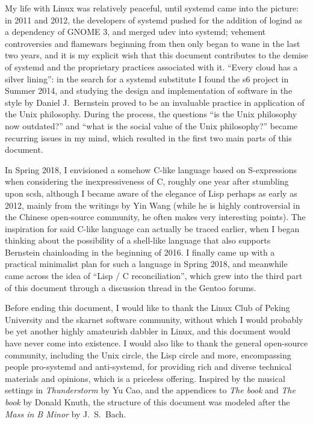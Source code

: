\documentclass{article}
\begin{document}
My life with Linux was relatively peaceful, until systemd came into the picture:
in 2011 and 2012, the developers of systemd pushed for the addition of logind
as a dependency of GNOME 3, and merged udev into
systemd; vehement controversies and flamewars beginning
from then only began to wane in the last two years,
and it is my explicit wish that this document contributes to the demise of
systemd and the proprietary practices associated with it.  ``Every cloud has
a silver lining'': in the search for a systemd substitute I found the s6 project
in Summer 2014, and studying the design and implementation of software in the
style by Daniel J.\ Bernstein proved to be an invaluable practice in application
of the Unix philosophy.  During the process, the questions ``is the Unix
philosophy now outdated?'' and ``what is the social value of the Unix
philosophy?'' became recurring issues in my mind, which resulted
in the first two main parts of this document.

In Spring 2018, I envisioned a somehow C-like language based on S-expressions
when considering the inexpressiveness of C, roughly
one year after stumbling upon scsh, although I
became aware of the elegance of Lisp perhaps as early as 2012, mainly from
the writings by Yin Wang (while he is highly controversial in the Chinese
open-source community, he often makes very interesting points).  The
inspiration for said C-like language can actually be traced earlier, when
I began thinking about the possibility of a shell-like language that also
supports Bernstein chainloading in the beginning of
2016.  I finally came up with a practical minimalist plan for such a language%
 in Spring 2018, and meanwhile came across the idea of
``Lisp / C reconciliation'', which grew into the third part of this document
through a discussion thread in the Gentoo forums.

Before ending this document, I would like to thank the Linux Club of Peking
University and the skarnet software community, without which I would probably
be yet another highly amateurish dabbler in Linux, and this document would
have never come into existence.  I would also like to thank the general
open-source community, including the Unix circle, the Lisp circle and more,
encompassing people pro-systemd and anti-systemd, for providing rich and
diverse technical materials and opinions, which is a priceless offering.
Inspired by the musical settings in \emph{Thunderstorm} by Yu Cao,
and the appendices to \emph{The book} and \emph{The
book} by Donald Knuth, the structure of this
document was modeled after the \emph{Mass in B Minor} by J.~S.\ Bach.
\end{document}
